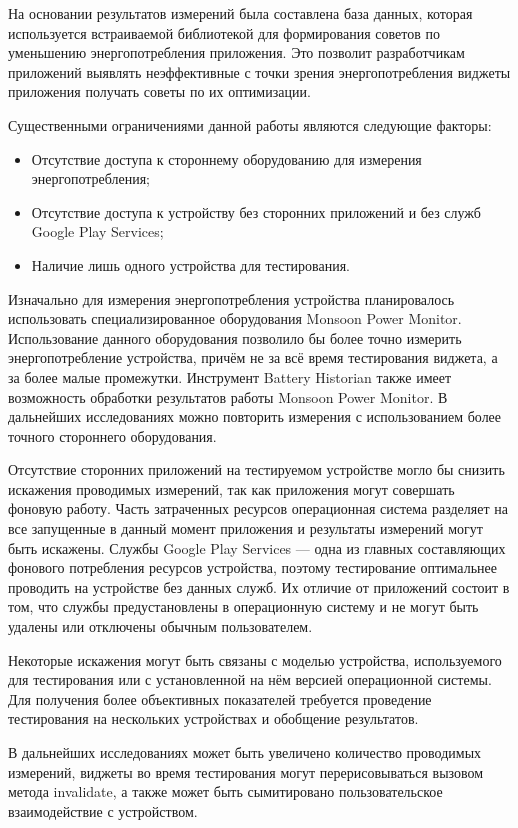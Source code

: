 \documentclass[a4paper,14pt]{extarticle} %
\begin{document}
	На основании результатов измерений была составлена база данных, которая используется встраиваемой библиотекой для формирования советов по уменьшению энергопотребления приложения. Это позволит разработчикам приложений выявлять неэффективные с точки зрения энергопотребления виджеты приложения получать советы по их оптимизации.
	
	Существенными ограничениями данной работы являются следующие факторы:
	\begin{itemize}
		\item Отсутствие доступа к стороннему оборудованию для измерения энергопотребления;
		\item Отсутствие доступа к устройству без сторонних приложений и без служб Google Play Services;
		\item Наличие лишь одного устройства для тестирования.
	\end{itemize}

	Изначально для измерения энергопотребления устройства планировалось использовать специализированное оборудования Monsoon Power Monitor. Использование данного оборудования позволило бы более точно измерить энергопотребление устройства, причём не за всё время тестирования виджета, а за более малые промежутки. Инструмент Battery Historian также имеет возможность обработки результатов работы Monsoon Power Monitor. В дальнейших исследованиях можно повторить измерения с использованием более точного стороннего оборудования.
	
	Отсутствие сторонних приложений на тестируемом устройстве могло бы снизить искажения проводимых измерений, так как приложения могут совершать фоновую работу. Часть затраченных ресурсов операционная система разделяет на все запущенные в данный момент приложения и результаты измерений могут быть искажены. Службы Google Play Services --- одна из главных составляющих фонового потребления ресурсов устройства, поэтому тестирование оптимальнее проводить на устройстве без данных служб. Их отличие от приложений состоит в том, что службы предустановлены в операционную систему и не могут быть удалены или отключены обычным пользователем.
	
	Некоторые искажения могут быть связаны с моделью устройства, используемого для тестирования или с установленной на нём версией операционной системы. Для получения более объективных показателей требуется проведение тестирования на нескольких устройствах и обобщение результатов.

	В дальнейших исследованиях может быть увеличено количество проводимых измерений, виджеты во время тестирования могут перерисовываться вызовом метода invalidate, а также может быть сымитировано пользовательское взаимодействие с устройством.
	
\end{document}
